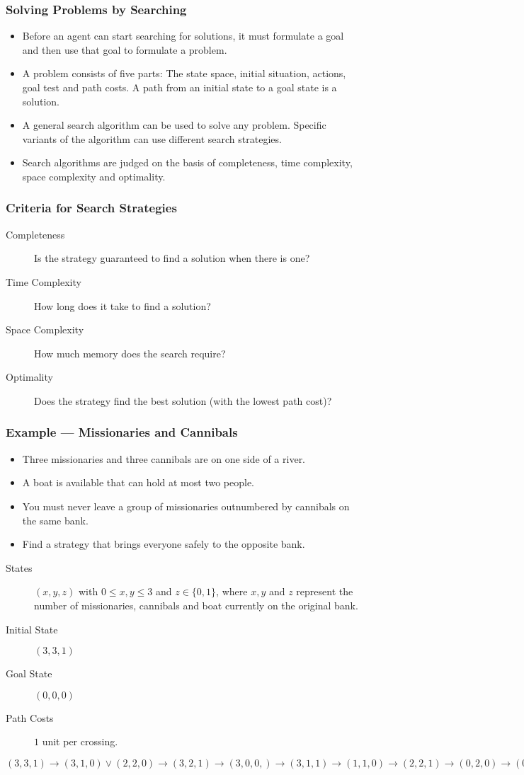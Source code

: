 \documentclass[UTF8,11pt,colorlinks,compress,openany]{beamer}%
\begin{document}
\begin{frame}\frametitle{Solving Problems by Searching}
\begin{itemize}
	\item Before an agent can start searching for solutions, it must formulate a goal and then use that goal to formulate a problem.
	\item A problem consists of five parts: The state space, initial situation, actions, goal test and path costs. A path from an initial state to a goal state is a solution.
	\item A general search algorithm can be used to solve any problem. Specific variants of the algorithm can use different search strategies.
	\item Search algorithms are judged on the basis of completeness, time complexity, space complexity and optimality.
\end{itemize}
\end{frame}

\begin{frame}\frametitle{Criteria for Search Strategies}
\begin{description}
	\item[Completeness] Is the strategy guaranteed to find a solution when there is one?
	\item[Time Complexity] How long does it take to find a solution?
	\item[Space Complexity] How much memory does the search require?
	\item[Optimality] Does the strategy find the best solution (with the lowest path cost)?
\end{description}
\end{frame}

\begin{frame}\frametitle{Example --- Missionaries and Cannibals}
\begin{itemize}
	\item Three missionaries and three cannibals are on one side of a river.
	\item A boat is available that can hold at most two people.
	\item You must never leave a group of missionaries outnumbered by cannibals on the same bank.
	\item Find a strategy that brings everyone safely to the opposite bank.
\end{itemize}
\begin{description}
	\item[States] $(x,y,z)$ with $0\leq x,y\leq 3$  and $z\in\{0,1\}$, where $x,y$ and $z$ represent the number of missionaries, cannibals and boat currently on the original bank.
	\item[Initial State] $(3,3,1)$
	\item[Goal State] $(0,0,0)$
	\item[Path Costs] $1$ unit per crossing.
\end{description}
$(3,3,1)\to(3,1,0)\vee(2,2,0)\to(3,2,1)\to(3,0,0,)\to(3,1,1)\to(1,1,0)\to(2,2,1)\to(0,2,0)\to(0,3,1)\to(0,1,0)\to(0,2,1)\vee(1,1,1)\to(0,0,0)$
\end{frame}
\end{document}
